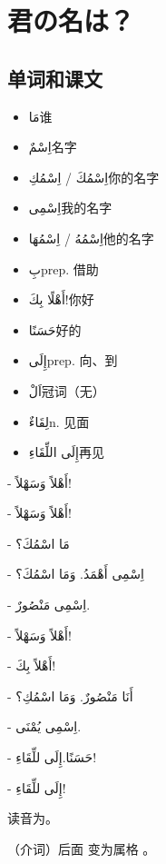 \chapter{君の名は？}

\section{ 单词和课文}

\begin{itemize}
    \item \ac{مَا}{谁}
    \item \ac{اِسْمٌ}{名字}
    \item \ac{اِسْمُكَ / اِسْمُكِ}{你的名字}
    \item \ac{اِسْمِى}{我的名字}
    \item \ac{اِسْمُهُ / اِسْمُهَا}{他的名字}
    \item \ac{بِ}{prep. 借助}
    \item \ac{أَهْلًا بِكَ!}{你好}
    \item \ac{حَسَنًا}{好的}
    \item \ac{إِلَى}{prep. 向、到}
    \item \ac{اَلْ}{冠词（无）}
    \item \ac{لِقَاءٌ}{n. 见面}
    \item \ac{إِلَى اللِّقَاءِ}{再见}
\end{itemize}

\begin{Arabic}
    - أَهْلاً وَسَهْلاً! 

    - أَهْلاً وَسَهْلاً!

    - مَا اسْمُكَ؟

    - اِسْمِى أَهْمَدُ. وَمَا اسْمُكَ؟

    - اِسْمِى مَنْصُورٌ.

    - أَهْلاً وَسَهْلاً!

    - أَهْلاً بِكَ!

    - أَنَا مَنْصُورٌ. وَمَا اسْمُكِ؟

    - اِسْمِى يُمْنَى.

    - حَسَنًا.إِلَى للِّقَاءِ!

    - إِلَى للِّقَاءِ! 
\end{Arabic}

\begin{note}
     读音为。

     （介词）后面  变为属格  。
\end{note}

